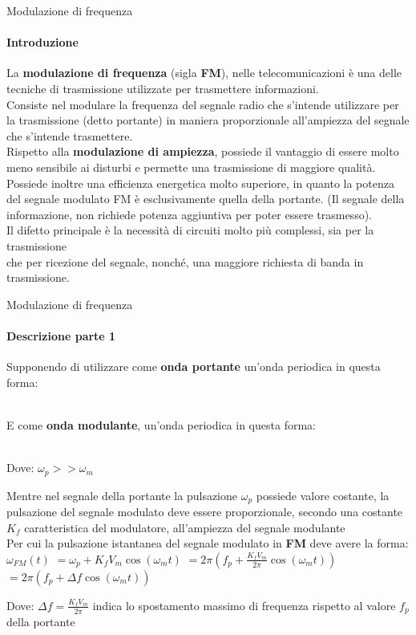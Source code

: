 \documentclass[aspectratio=169]{beamer}
\begin{document}
\begin{frame}{Modulazione di frequenza}
	\framesubtitle{Introduzione}
	La \textbf{modulazione di frequenza} (sigla \textbf{FM}), nelle telecomunicazioni è una delle tecniche di trasmissione utilizzate per trasmettere informazioni.\\
	Consiste nel modulare la frequenza del segnale radio che s'intende utilizzare per la trasmissione (detto portante) in maniera proporzionale all'ampiezza del segnale che s'intende trasmettere.\\
	\medskip
	Rispetto alla \textbf{modulazione di ampiezza}, possiede il vantaggio di essere molto meno sensibile ai disturbi e permette una trasmissione di maggiore qualità. Possiede inoltre una efficienza energetica molto superiore, in quanto la potenza del segnale modulato FM è esclusivamente quella della portante. (Il segnale della informazione, non richiede potenza aggiuntiva per poter essere trasmesso).\\
	\medskip
	Il difetto principale è la necessità di circuiti molto più complessi, sia per la trasmissione\\ che per ricezione  del segnale, nonché, una maggiore richiesta di banda in trasmissione. \\
	\end{frame}

\begin{frame}{Modulazione di frequenza}
	\framesubtitle{Descrizione parte 1}
	Supponendo di utilizzare come \textbf{onda portante} un'onda periodica in questa forma:\\
	\smallskip
	\\
	\smallskip
	\raggedright{E come \textbf{onda modulante}, un'onda periodica in questa forma:}\\
	\smallskip
	\\
	\smallskip
	\raggedright{Dove: $\omega_{p}>>\omega_{m}$}\\
	\smallskip
	\raggedright{Mentre nel segnale della portante la pulsazione $\omega_{p}$ possiede valore costante, la pulsazione del segnale modulato deve essere proporzionale, secondo una costante $K_f$ caratteristica del modulatore, all'ampiezza del segnale modulante}\\
	\smallskip
	Per cui la pulsazione istantanea del segnale modulato in \textbf{FM} deve avere la forma:\\
	\quad \textcolor{red!80}{$\omega_{FM}(t) $} $= \omega_{p} + K_{f} V_{m} \cos(\omega_{m}t)$
	$= 2\pi(f_{p} + \frac{K_{f} V_{m}}{2\pi} \cos(\omega_{m}t))$
	\textcolor{red!80}{$= 2\pi(f_{p} + \Delta f \cos(\omega_{m}t))$}\\
	\smallskip
	\raggedright{Dove: $\Delta f = \frac{K_{f} V_{m}}{2\pi}$ indica lo spostamento massimo di frequenza rispetto al valore $f_{p}$ \\della portante}
\end{frame}
\end{document}
